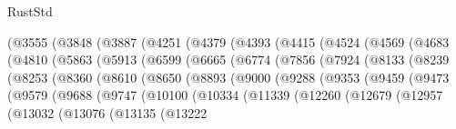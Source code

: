\begin{lexlean}{RustStd}
\begin{coremodule}
            (@3555
              (@3848
                (@3887
                  (@4251
                    (@4379
                      (@4393
                        (@4415
                          (@4524
                            (@4569
                              (@4683
                                (@4810
                                  (@5863
                                    (@5913
                                      (@6599
                                        (@6665
                                          (@6774
                                            (@7856
                                              (@7924
                                                (@8133
                                                  (@8239
                                                    (@8253
                                                      (@8360
                                                        (@8610
                                                          (@8650
                                                            (@8893
                                                              (@9000
                                                                (@9288
                                                                  (@9353
                                                                    (@9459
                                                                      (@9473
                                                                        (@9579
                                                                          (@9688
                                                                            (@9747
                                                                              (@10100
                                                                                (@10334
                                                                                  (@11339
                                                                                    (@12260
                                                                                      (@12679
                                                                                        (@12957
                                                                                          (@13032
                                                                                            (@13076
                                                                                              (@13135
                                                                                                (@13222

\end{coremodule}
\end{lexlean}
